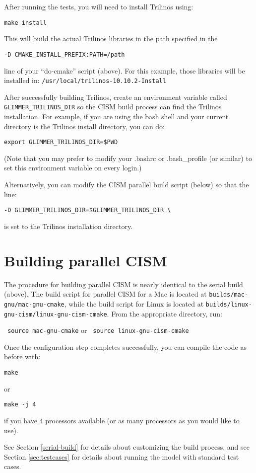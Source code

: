 After running the tests, you will need to install Trilinos using:

 \texttt{make install}

This will build the actual Trilinos libraries in the path specified in the

\begin{verbatim}
-D CMAKE_INSTALL_PREFIX:PATH=/path
\end{verbatim} 

line of your ``do-cmake'' script (above). For this example, those libraries will be 
installed in: \texttt{/usr/local/trilinos-10.10.2-Install}

After successfully building Trilinos, create an environment variable called \texttt{GLIMMER\_TRILINOS\_DIR}
so the CISM build process can find the Trilinos installation.  For example, if you 
are using the bash shell and your current directory is the Trilinos install directory, you can do:
\begin{verbatim}
export GLIMMER_TRILINOS_DIR=$PWD
\end{verbatim}
(Note that you may prefer to modify your .bashrc or .bash\_profile (or similar)
to set this environment variable on every login.)

Alternatively, you can modify the CISM parallel build script (below) so that the line:
\begin{verbatim}
-D GLIMMER_TRILINOS_DIR=$GLIMMER_TRILINOS_DIR \
\end{verbatim}
is set to the Trilinos installation directory.





\section{Building parallel CISM}

The procedure for building parallel CISM is nearly identical to the serial build (above).
The build script for parallel CISM for a Mac is located at \texttt{builds/mac-gnu/mac-gnu-cmake}, 
while the build script for Linux is located at \texttt{builds/linux-gnu-cism/linux-gnu-cism-cmake}.
From the appropriate directory, run:

\texttt{ source mac-gnu-cmake} or \texttt{ source linux-gnu-cism-cmake}

Once the configuration step completes successfully, you can compile the code as before with:

\texttt{make}

or

\texttt{make -j 4}

if you have 4 processors available (or as many processors as you would like to use).

See Section \ref{serial-build} for details about customizing the build process, and 
see Section \ref{sec:testcases} for details about running the model with standard
test cases.


